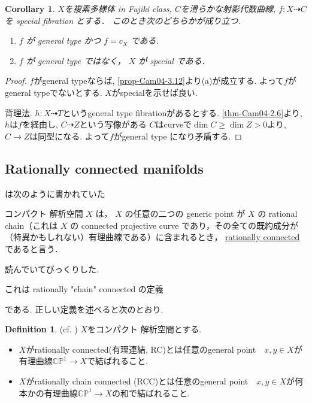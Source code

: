 \documentclass[dvipdfmx,a4paper,11pt]{article} %
\newtheorem{cor}[thm]{Corollary}
\theoremstyle{definition}
\newtheorem{defn}[thm]{Definition}
\theoremstyle{remark}
\numberwithin{equation}{section}
\newcommand{\C}{\mathbb{C}}
\begin{document}
\begin{cor}\cite[Corollary 3.18]{Cam04}
\label{cor-Cam04-3.18}
$X$を複素多様体 in Fujiki class, $C$を滑らかな射影代数曲線, 
$f : X \dashrightarrow C$ を special fibration とする．
このとき次のどちらかが成り立つ.
\begin{enumerate}
\item[(a)] $f$ が general type かつ $f=c_X$ である.
\item[(b)] $f$ が general type ではなく， $X$ が special である．
\end{enumerate}
\end{cor}

\begin{proof}
$f$がgeneral typeならば, \ref{prop-Cam04-3.12}より(a)が成立する. 
よって$f$がgeneral typeでないとする. 
$X$がspecialを示せば良い. 

背理法. $h : X \dashrightarrow T$というgeneral type fibrationがあるとする. 
 \ref{thm-Cam04-2.6}より, $h$は$f$を経由し, $C \dashrightarrow Z$という写像がある
 $C$はcurveで$ \dim C \ge \dim Z >0$より, $C\to Z$は同型になる. よって$f$がgeneral type になり矛盾する. 
 \end{proof}


\subsection{Rationally connected manifolds \cite[3.3]{Cam04}}
\cite[Subsection 3.3]{Cam04}は次のように書かれていた
\begin{tcolorbox}
コンパクト 解析空間 $X$ は， $X$ の任意の二つの generic point が $X$ の rational chain（これは $X$ の connected projective curve であり，その全ての既約成分が（特異かもしれない）有理曲線である）に含まれるとき， \underline{rationally connected}であると言う．
\end{tcolorbox}

読んでいてびっくりした. 
\begin{center}
これは rationally "chain" connected の定義
\end{center}
である. 正しい定義を述べると次のとおり.

\begin{defn}(cf. \cite[Chapter 4 Section 4.1, 4.5]{Deb01})
$X$をコンパクト 解析空間とする.
\begin{itemize}
\item $X$がrationally connected(有理連結, RC)とは任意のgeneral point　$x, y \in X$が有理曲線$\C\mathbb{P}^1 \to X$で結ばれること.
\item $X$がrationally chain connected (RCC)とは任意のgeneral point　$x, y \in X$が何本かの有理曲線$\C\mathbb{P}^1 \to X$の和で結ばれること.
\end{itemize}
\end{defn}
\end{document}
